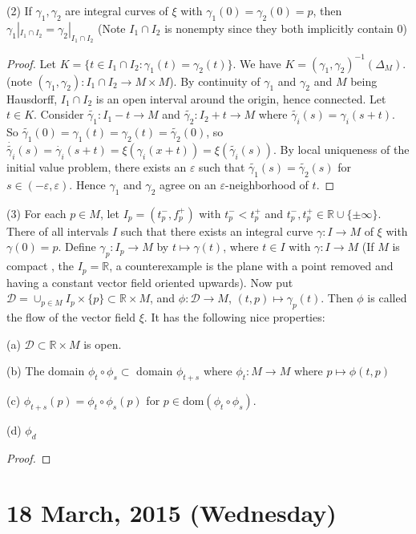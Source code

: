 \documentclass{article}
\begin{document}
(2) If $\gamma_1, \gamma_2$ are integral curves of $\xi$ with $\gamma_1(0) = \gamma_2(0) = p$, then $\gamma_1|_{I_1 \cap I_2} = \gamma_2|_{I_1 \cap I_2}$ (Note $I_1 \cap I_2$ is nonempty since they both implicitly contain 0)
\begin{proof}
Let $K = \{ t \in I_1 \cap I_2 : \gamma_1(t) = \gamma_2(t) \}$. We have $K = (\gamma_1, \gamma_2)^{-1}(\Delta_M)$. (note $(\gamma_1, \gamma_2): I_1 \cap I_2 \to M \times M$). By continuity of $\gamma_1$ and $\gamma_2$ and $M$ being Hausdorff, $I_1 \cap I_2$ is an open interval around the origin, hence connected. Let $t \in K$. Consider $\tilde{\gamma_1}: I_1 - t \to M$ and $\tilde{\gamma_2}: I_2 + t \to M$ where $\tilde{\gamma_i}(s) = \gamma_i(s+t)$. So $\tilde{\gamma_1}(0) = \gamma_1(t) = \gamma_2(t) = \tilde{\gamma_2}(0)$, so $\dot{\tilde{\gamma_i}}(s) = \dot{\gamma_i}(s+t) = \xi(\gamma_i(x + t)) = \xi(\tilde{\gamma_i}(s))$. By local uniqueness of the initial value problem, there exists an $\varepsilon$ such that $\tilde{\gamma_1}(s) = \tilde{\gamma_2}(s)$ for $s \in (-\varepsilon, \varepsilon)$. Hence $\gamma_1$ and $\gamma_2$ agree on an $\varepsilon$-neighborhood of $t$.
\end{proof}

(3) For each $p \in M$, let $I_p = (t_p^-, f_p^+)$ with $t_p^- < t_p^+$ and $t_p^-, t_p^+ \in \mathbb{R} \cup \{ \pm \infty \}$. There of all intervals $I$ such that there exists an integral curve $\gamma : I \to M$ of $\xi$ with $\gamma(0) = p$. Define $\gamma_p: I_p \to M$ by $t \mapsto \gamma(t)$, where $t \in I$ with $\gamma:I \to M$ (If $M$ is compact , the $I_p = \mathbb{R}$, a counterexample is the plane with a point removed and having a constant vector field oriented upwards). Now put $\mathcal{D} = \cup_{p \in M}I_p \times \{ p \} \subset \mathbb{R} \times M$, and $\phi:\mathcal{D} \to M$, $(t,p) \mapsto \gamma_p(t)$. Then $\phi$ is called the flow of the vector field $\xi$. It has the following nice properties:

(a) $\mathcal{D} \subset \mathbb{R} \times M$ is open.
 
(b) The domain $\phi_t \circ \phi_s \subset $ domain $\phi_{t+s}$ where $\phi_t: M \to M$ where $p \mapsto \phi(t,p)$

(c) $\phi_{t+ s}(p) = \phi_t \circ \phi_s(p)$ for $p \in \text{dom}(\phi_t \circ \phi_s)$.

(d) $\phi_d$
\begin{proof}
\end{proof}

\section{18 March, 2015 (Wednesday)}
\end{document}
